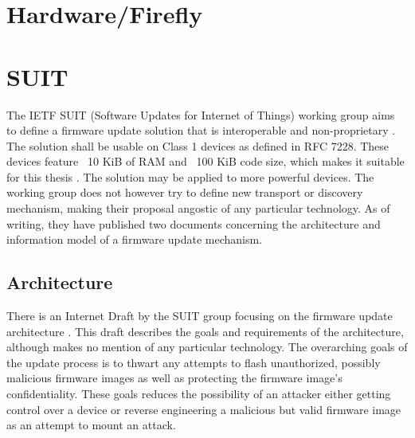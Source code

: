 \documentclass[0-thesis.tex]{subfiles}
\begin{document}
\section{Hardware/Firefly}

\section{SUIT}
The IETF SUIT (Software Updates for Internet of Things) working group aims to define a firmware 
update solution that is interoperable and non-proprietary \parencite{suit}. The solution shall 
be usable on Class 1 devices as defined in RFC 7228. These devices feature ~10 KiB of RAM and 
~100 KiB code size, which makes it suitable for this thesis \parencite{rfc7228}. The solution 
may be applied to more powerful devices. The working group does not however try to define 
new transport or discovery mechanism, making their proposal angostic of any particular 
technology. As of writing, they have published two documents concerning the architecture and 
information model of a firmware update mechanism.

\subsection{Architecture}
There is an Internet Draft by the SUIT group focusing on the firmware update architecture 
\parencite{suit-architecture}. This draft describes the goals and requirements of the 
architecture, although makes no mention of any particular technology. The overarching goals 
of the update process is to thwart any attempts to flash unauthorized, possibly malicious 
firmware images as well as protecting the firmware image's confidentiality. These goals 
reduces the possibility of an attacker either getting control over a device or 
reverse engineering a malicious but valid firmware image as an attempt to mount an attack.
\end{document}
